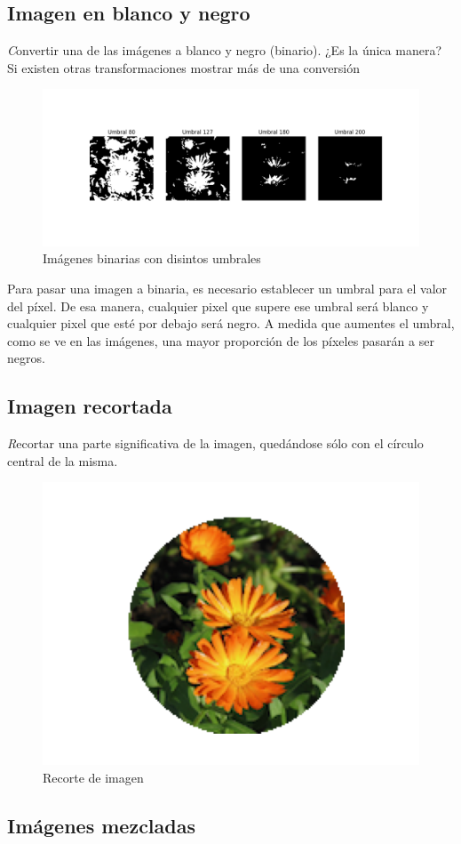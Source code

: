 \documentclass{article}
\begin{document}
\subsection{Imagen en blanco y negro}

{\emph Convertir una de las imágenes a blanco y negro (binario). ¿Es la única manera? Si existen otras transformaciones mostrar más de una conversión}
\pagebreak
\begin{figure}[h!]
  \centering    
  \includegraphics[width=.75 \textwidth]{3_binario.png}
  \caption{Imágenes binarias con disintos umbrales}
\end{figure}

Para pasar una imagen a binaria, es necesario establecer un umbral para el valor del píxel.
De esa manera, cualquier pixel que supere ese umbral será blanco y cualquier pixel que esté por
debajo será negro. A medida que aumentes el umbral, como se ve en las imágenes, una mayor proporción
de los píxeles pasarán a ser negros.

\subsection{Imagen recortada}
\label{others}

{\emph Recortar una parte significativa de la imagen, quedándose sólo con el círculo central de la misma.}

\begin{figure}[h!]
  \centering    
  \includegraphics[width=.3\textwidth]{4_recortado.png}
  \caption{Recorte de imagen}
\end{figure}
\subsection{Imágenes mezcladas}
\end{document}
